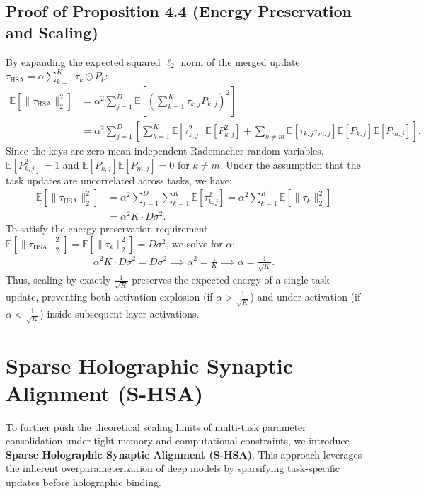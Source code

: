 \documentclass{article}
\theoremstyle{plain}
\theoremstyle{definition}
\theoremstyle{remark}
\begin{document}
\subsection{Proof of Proposition 4.4 (Energy Preservation and Scaling)}
\label{proof:energy}
By expanding the expected squared $\ell_2$ norm of the merged update $\tau_{\text{HSA}} = \alpha \sum_{k=1}^K \tau_k \odot P_k$:
\begin{align}
    \mathbb{E}[\|\tau_{\text{HSA}}\|_2^2] &= \alpha^2 \sum_{j=1}^D \mathbb{E}\left[ \left( \sum_{k=1}^K \tau_{k,j} P_{k,j} \right)^2 \right] \nonumber \\
    &= \alpha^2 \sum_{j=1}^D \left[ \sum_{k=1}^K \mathbb{E}[\tau_{k,j}^2] \mathbb{E}[P_{k,j}^2] + \sum_{k \neq m} \mathbb{E}[\tau_{k,j} \tau_{m,j}] \mathbb{E}[P_{k,j}] \mathbb{E}[P_{m,j}] \right].
\end{align}
Since the keys are zero-mean independent Rademacher random variables, $\mathbb{E}[P_{k,j}^2] = 1$ and $\mathbb{E}[P_{k,j}] \mathbb{E}[P_{m,j}] = 0$ for $k \neq m$. Under the assumption that the task updates are uncorrelated across tasks, we have:
\begin{align}
    \mathbb{E}[\|\tau_{\text{HSA}}\|_2^2] &= \alpha^2 \sum_{j=1}^D \sum_{k=1}^K \mathbb{E}[\tau_{k,j}^2] = \alpha^2 \sum_{k=1}^K \mathbb{E}[\|\tau_k\|_2^2] \nonumber \\
    &= \alpha^2 K \cdot D\sigma^2.
\end{align}
To satisfy the energy-preservation requirement $\mathbb{E}[\|\tau_{\text{HSA}}\|_2^2] = \mathbb{E}[\|\tau_k\|_2^2] = D\sigma^2$, we solve for $\alpha$:
\begin{align}
    \alpha^2 K \cdot D\sigma^2 = D\sigma^2 \implies \alpha^2 = \frac{1}{K} \implies \alpha = \frac{1}{\sqrt{K}}.
\end{align}
Thus, scaling by exactly $\frac{1}{\sqrt{K}}$ preserves the expected energy of a single task update, preventing both activation explosion (if $\alpha > \frac{1}{\sqrt{K}}$) and under-activation (if $\alpha < \frac{1}{\sqrt{K}}$) inside subsequent layer activations.

\section{Sparse Holographic Synaptic Alignment (S-HSA)}
\label{sec:sparse_hsa}
To further push the theoretical scaling limits of multi-task parameter consolidation under tight memory and computational constraints, we introduce \textbf{Sparse Holographic Synaptic Alignment (S-HSA)}. This approach leverages the inherent overparameterization of deep models by sparsifying task-specific updates before holographic binding.
\end{document}
